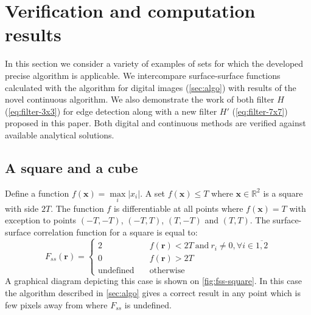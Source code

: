 \documentclass[1p]{elsarticle}
\begin{document}
\section{Verification and computation results}
\label{sec:results}
In this section we consider a variety of examples of sets for which the developed
precise algorithm is applicable. We intercompare surface-surface functions
calculated with the algorithm for digital images (\cref{sec:algo}) with results
of the novel continuous algorithm. We also demonstrate the work of both filter
$H$ (\ref{eq:filter-3x3}) for edge detection along with a new filter $H'$
(\ref{eq:filter-7x7}) proposed in this paper. Both digital and
continuous methods are verified against available analytical solutions.

\subsection{A square and a cube}
Define a function $f(\bm{x}) = \max\limits_i |x_i|$. A set $f(\bm{x}) \le T$
where $\bm{x} \in \mathbb{R}^2$ is a square with side $2T$. The function $f$ is
differentiable at all points where $f(\bm{x}) = T$ with exception to points
$(-T, -T)$, $(-T, T)$, $(T, -T)$ and $(T, T)$. The surface-surface correlation
function for a square is equal to:
\begin{equation}
  F_{ss}(\bm{r}) = \left\{
  \begin{array}{ll}
    2 & \quad f(\bm{r}) < 2T \ \text{and}\ r_i \ne 0, \forall i \in \overline{1,2} \\
    0 & \quad f(\bm{r}) > 2T \\
    \text{undefined} & \quad \text{otherwise}
  \end{array}
  \right.
\end{equation}
A graphical diagram depicting this case is shown on \cref{fig:fss-square}. In
this case the algorithm described in \cref{sec:algo} gives a correct result in
any point which is few pixels away from where $F_{ss}$ is undefined.
\end{document}
